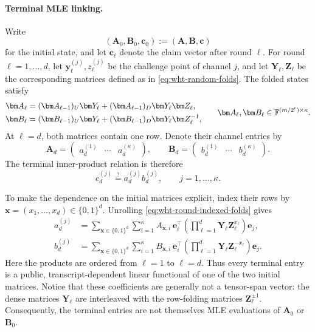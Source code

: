 \documentclass[runningheads]{llncs}
\begin{document}
\paragraph{Terminal MLE linking.}
Write
\[
    (\bm A_0,\bm B_0,\bm c_0)
      :=(\bm A,\bm B,\bm c)
\]
for the initial state, and let \(\bm c_\ell\) denote the claim vector
after round \(\ell\).  For round \(\ell=1,\ldots,d\), let
\(\bm y_\ell^{(j)},z_\ell^{(j)}\) be the challenge point of channel \(j\),
and let \(\bm Y_\ell,\bm Z_\ell\) be the corresponding matrices defined as
in \eqref{eq:wht-random-folds}.  The folded states satisfy
\begin{equation}
\begin{aligned}
    \bm A_\ell
      &=
      (\bm A_{\ell-1})_U\bm Y_\ell
      +(\bm A_{\ell-1})_D\bm Y_\ell\bm Z_\ell,\\
    \bm B_\ell
      &=
      (\bm B_{\ell-1})_U\bm Y_\ell
      +(\bm B_{\ell-1})_D\bm Y_\ell\bm Z_\ell^{-1},
\end{aligned}
\qquad
    \bm A_\ell,\bm B_\ell
      \in\Field^{(m/2^\ell)\times\kappa}.
\label{eq:wht-round-indexed-folds}
\end{equation}
At \(\ell=d\), both matrices contain one row.  Denote their channel
entries by
\[
    \bm A_d=
      \begin{pmatrix}
        a_d^{(1)}&\cdots&a_d^{(\kappa)}
      \end{pmatrix},
    \qquad
    \bm B_d=
      \begin{pmatrix}
        b_d^{(1)}&\cdots&b_d^{(\kappa)}
      \end{pmatrix}.
\]
The terminal inner-product relation is therefore
\begin{equation}
    c_d^{(j)}
      \stackrel{?}{=}
      a_d^{(j)}b_d^{(j)},
    \qquad j=1,\ldots,\kappa.
\label{eq:wht-terminal-products}
\end{equation}

To make the dependence on the initial matrices explicit, index their
rows by \(\bm x=(x_1,\ldots,x_d)\in\{0,1\}^d\).  Unrolling
\eqref{eq:wht-round-indexed-folds} gives
\begin{equation}
\begin{aligned}
    a_d^{(j)}
      &=
      \sum_{\bm x\in\{0,1\}^d}
      \sum_{i=1}^{\kappa}
      A_{\bm x,i}\,
      \bm e_i^\top
      \left(
        \prod_{\ell=1}^{d}
          \bm Y_\ell\bm Z_\ell^{x_\ell}
      \right)
      \bm e_j,\\
    b_d^{(j)}
      &=
      \sum_{\bm x\in\{0,1\}^d}
      \sum_{i=1}^{\kappa}
      B_{\bm x,i}\,
      \bm e_i^\top
      \left(
        \prod_{\ell=1}^{d}
          \bm Y_\ell\bm Z_\ell^{-x_\ell}
      \right)
      \bm e_j.
\end{aligned}
\label{eq:wht-terminal-linear-maps}
\end{equation}
Here the products are ordered from \(\ell=1\) to \(\ell=d\).  Thus every
terminal entry is a public, transcript-dependent linear functional of
one of the two initial matrices.  Notice that these coefficients are
generally not a tensor-span vector: the dense matrices \(\bm Y_\ell\)
are interleaved with the row-folding matrices \(\bm Z_\ell^{\pm1}\).
Consequently, the terminal entries are not themselves MLE evaluations
of \(\bm A_0\) or \(\bm B_0\).
\end{document}
